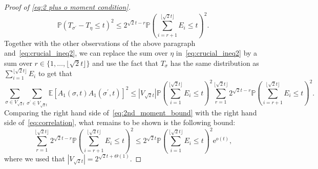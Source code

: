 \documentclass[11pt]{article}
\numberwithin{equation}{section}
\newcommand{\p}{\mathbb{P}} %
\newcommand{\E}{\mathbb{E}} %
\newcommand{\e}{\mathrm e}
\theoremstyle{definition}
\begin{document}
\begin{proof}[Proof of \eqref{eq:2 plus o moment condition}]
$$     \p \left( T_{\sigma^\prime} - T_\eta \leq t   \right)^{2} \leq  2^{\sqrt{2}t - r}
\p \left( \sum_{i=r+1}^{\lfloor \sqrt{2} t \rfloor } E_i  \leq t   \right)^{2}.$$
Together with the other observations of the above paragraph and~\eqref{eq:crucial_ineq2}, we can replace the sum over $\eta$ in~\eqref{eq:crucial_ineq2} by a sum over $r \in  \{1,\ldots,\lfloor \sqrt{2} t \rfloor\}$  and use the fact that $T_{\sigma}$ has the same distribution as $\sum_{i=1}^{\lfloor \sqrt{2} t \rfloor} E_{i}$ to get that 
\begin{equation}\label{eq:2nd_moment_bound}
\sum_{\sigma \in V_{\sqrt{2}t}} \sum_{\sigma^\prime \in V_{\sqrt{2}t}}
\E \left[  A_1(\sigma,t) A_1(\sigma^\prime,t)   \right]^2
\leq
\left|V_{\sqrt{2}t}\right| \p \left( \sum_{i=1}^{\lfloor \sqrt{2} t \rfloor} E_i \leq t \right)^2 \sum_{r=1}^{\lfloor \sqrt{2}t \rfloor} 2^{\sqrt{2}t - r}
\p \left( \sum_{i=r+1}^{\lfloor \sqrt{2} t \rfloor } E_i  \leq t   \right)^{2}.
\end{equation} 
Comparing the right hand side of~\eqref{eq:2nd_moment_bound} with the right hand side of~\eqref{eq:correlation}, 
what remains to be shown is the following bound:
\begin{equation}\label{eq:to show whp identity}
    \sum_{r=1}^{\lfloor \sqrt{2}t \rfloor}
    2^{\sqrt{2}t-r}
    \mathbb{P} \left( \sum_{i=r+1}^{\lfloor \sqrt{2}t \rfloor} E_i \leq t \right)^{2} \leq 
    2^{\sqrt{2} t}
    \p \left( \sum_{i=1}^{\lfloor \sqrt{2} t \rfloor} E_i \leq t \right)^2   \e^{o(t)},
\end{equation}
where we used that $|V_{\sqrt{2}t}| = 2^{\sqrt{2}t + \Theta(1)}$.


\end{proof}
\end{document}
